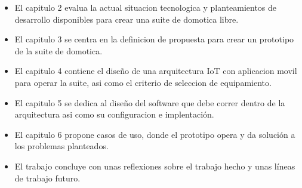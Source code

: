\begin{itemize}
  \item El capitulo 2 evalua la actual situacion tecnologica y planteamientos de desarrollo disponibles para crear una suite de domotica libre.

  \item El capitulo 3 se centra en la definicion de propuesta para crear un prototipo de la suite de domotica.

  \item El capitulo 4 contiene el diseño de una arquitectura IoT con aplicacion movil para operar la suite, asi como el criterio de seleccion de equipamiento.

  \item El capitulo 5 se dedica al diseño del software que debe correr dentro de la arquitectura asi como su configuracion e implentación.

  \item El capitulo 6 propone casos de uso, donde el prototipo opera y da solución a los problemas planteados.

  \item El trabajo concluye con unas reflexiones sobre el trabajo hecho y unas líneas de trabajo futuro.
\end{itemize}
